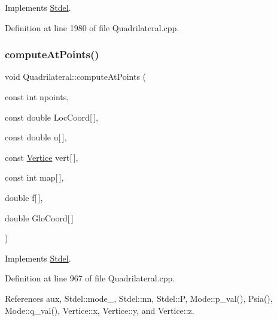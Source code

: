Implements \hyperlink{classStdel_a69b8ef7def7891fcb2d5d8fd9b75bdc8}{Stdel}.



Definition at line 1980 of file Quadrilateral.\+cpp.

\mbox{\label{classQuadrilateral_af9b570b455246c2527fa87f186fdabb2}} 
\subsubsection{\texorpdfstring{compute\+At\+Points()}{computeAtPoints()}}
{\footnotesize\ttfamily void Quadrilateral\+::compute\+At\+Points (\begin{DoxyParamCaption}\item[{const int}]{npoints,  }\item[{const double}]{Loc\+Coord\mbox{[}$\,$\mbox{]},  }\item[{const double}]{u\mbox{[}$\,$\mbox{]},  }\item[{const \hyperlink{structVertice}{Vertice}}]{vert\mbox{[}$\,$\mbox{]},  }\item[{const int}]{map\mbox{[}$\,$\mbox{]},  }\item[{double}]{f\mbox{[}$\,$\mbox{]},  }\item[{double}]{Glo\+Coord\mbox{[}$\,$\mbox{]} }\end{DoxyParamCaption})\hspace{0.3cm}{\ttfamily [virtual]}}



Implements \hyperlink{classStdel_a03e038055d238608efce470629863c36}{Stdel}.



Definition at line 967 of file Quadrilateral.\+cpp.



References aux, Stdel\+::mode\+\_\+, Stdel\+::nn, Stdel\+::P, Mode\+::p\+\_\+val(), Psia(), Mode\+::q\+\_\+val(), Vertice\+::x, Vertice\+::y, and Vertice\+::z.

